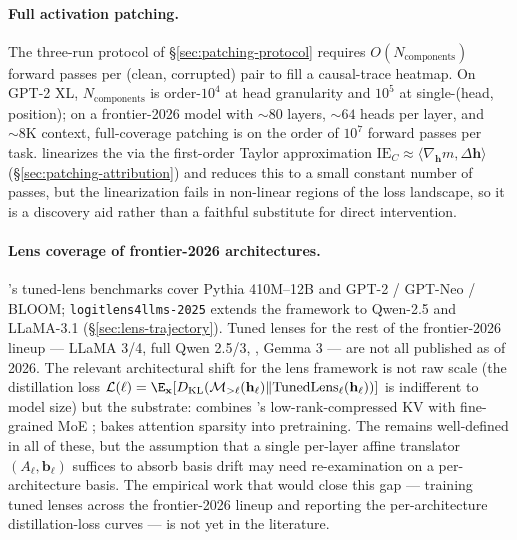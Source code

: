 \paragraph{Full activation patching.}
The three-run protocol of \S\ref{sec:patching-protocol} requires
$O(N_{\mathrm{components}})$ forward passes per (clean, corrupted) pair
to fill a causal-trace heatmap. On GPT-2 XL, $N_{\mathrm{components}}$
is order-$10^4$ at head granularity and $10^5$ at single-(head,
position); on a frontier-2026 model with $\sim 80$ layers, $\sim 64$
heads per layer, and $\sim 8\text{K}$ context, full-coverage patching
is on the order of $10^7$ forward passes per task. 
linearizes the  via the
first-order Taylor approximation
$\mathrm{IE}_C \approx \langle \nabla_{\mathbf{h}} m,
\Delta \mathbf{h} \rangle$
(\S\ref{sec:patching-attribution}) and reduces this to a small constant
number of passes, but the linearization fails in non-linear regions of
the loss landscape, so it is a discovery aid rather than a faithful
substitute for direct intervention.

\paragraph{Lens coverage of frontier-2026 architectures.}
\citet{belrose2023-tuned-lens}'s tuned-lens benchmarks cover Pythia
410M--12B and GPT-2 / GPT-Neo / BLOOM; \texttt{logitlens4llms-2025}
extends the framework to Qwen-2.5 and LLaMA-3.1
(\S\ref{sec:lens-trajectory}). Tuned lenses for the rest of the
frontier-2026 lineup --- LLaMA 3/4, full Qwen 2.5/3, ,
Gemma 3 --- are not all published as of 2026. The relevant
architectural shift for the lens framework is not raw scale (the
distillation loss
$\mathcal{L}(\ell) = \E_{\mathbf{x}}[D_{\mathrm{KL}}(\mathcal{M}_{>\ell}
(\mathbf{h}_\ell) \| \mathrm{TunedLens}_\ell(\mathbf{h}_\ell))]$ is
indifferent to model size) but the substrate:  combines 
\citep{deepseek-v2}'s low-rank-compressed KV with fine-grained MoE
\citep{deepseekmoe2024};  \citep{yuan2025} bakes attention sparsity
into pretraining. The  remains well-defined in all of
these, but the assumption that a single per-layer affine translator
$(A_\ell, \mathbf{b}_\ell)$ suffices to absorb basis drift may need
re-examination on a per-architecture basis. The empirical work that
would close this gap --- training tuned lenses across the frontier-2026
lineup and reporting the per-architecture distillation-loss curves ---
is not yet in the literature.


